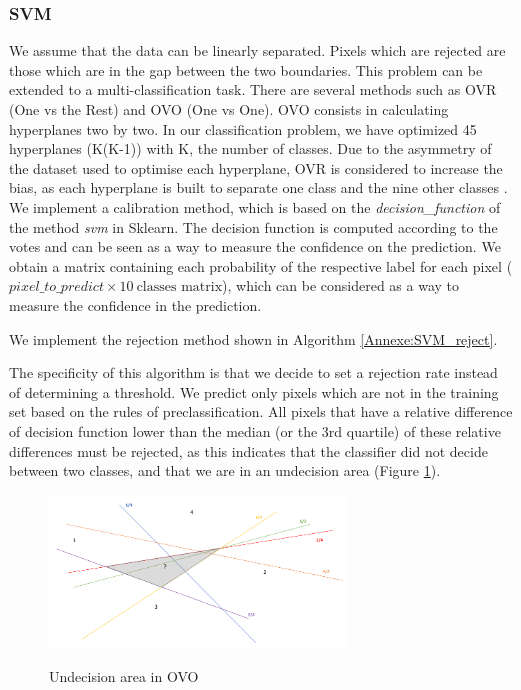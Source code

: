 \documentclass{siamart171218}
\begin{document}
\subsubsection{SVM}
We assume that the data can be linearly separated. Pixels which are rejected are those which are in the gap between the two boundaries. 
This problem can be extended to a multi-classification task. There are several methods such as OVR (One vs the Rest) and OVO (One vs One). OVO consists in calculating hyperplanes two by two. In our classification problem, we have optimized 45 hyperplanes (K(K-1)) with K, the number of classes. Due to the asymmetry of the dataset used to optimise each hyperplane, OVR is considered to increase the bias, as each hyperplane is built to separate one class and the nine other classes \cite{djeffal_2012}. \\

We implement a calibration method, which is based on the \textit{decision\_function} of the method \textit{svm} in Sklearn. The decision function is computed according to the votes and can be seen as a way to measure the confidence on the prediction. We obtain a matrix containing each probability of the respective label for each pixel ($pixel\_to\_predict \times 10~\text{classes matrix}$), which can be considered as a way to measure the confidence in the prediction. 

We implement the rejection method shown in Algorithm \ref{Annexe:SVM_reject}.

The specificity of this algorithm is that we decide to set a rejection rate instead of determining a threshold. We predict only pixels which are not in the training set based on the rules of preclassification. All pixels that have a relative difference of decision function lower than the median (or the 3rd quartile) of these relative differences must be rejected, as this indicates that the classifier did not decide between two classes, and that we are in an undecision area (Figure \ref{fig2}). 



\begin{figure} [!h]
\begin{center}
\includegraphics[width=0.7\textwidth]{undecision boundary svm.PNG}~\\[1cm]
\caption{Undecision area in OVO}
\label{fig2}
\end{center}
\end{figure}
\end{document}
